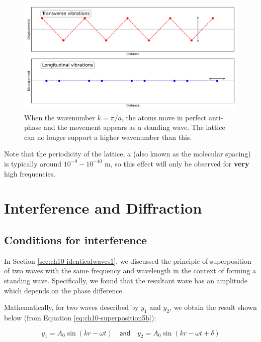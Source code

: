 \documentclass[
]{book}
\begin{document}
\begin{figure}

{\centering \includegraphics[width=0.7\linewidth]{visualisations/ch12-phonons2} 

}

\caption{When the wavenumber $k = \pi / a$, the atoms move in perfect anti-phase and the movement appears as a standing wave. The lattice can no longer support a higher wavenumber than this.}\label{fig:ch12-dispersionlattice1}
\end{figure}

Note that the periodicity of the lattice, \(a\) (also known as the molecular spacing) is typically around \(10^{-9} - 10^{-10}\) m, so this effect will only be observed for \textbf{very} high frequencies.

\hypertarget{sec:ch13-interference}{%
\chapter{Interference and Diffraction}\label{sec:ch13-interference}}

\hypertarget{sec:ch13-conditionsinterference}{%
\section{Conditions for interference}\label{sec:ch13-conditionsinterference}}

In Section \ref{sec:ch10-identicalwaves1}, we discussed the principle of superposition of two waves with the same frequency and wavelength in the context of forming a standing wave. Specifically, we found that the resultant wave has an amplitude which depends on the phase difference.

Mathematically, for two waves described by \(y_1\) and \(y_2\), we obtain the result shown below (from Equation \eqref{eq:ch10-superposition5b}):

\begin{equation}
y_1 = A_0 \sin(k r - \omega t) \quad \textsf{and} \quad y_2 = A_0 \sin(k r - \omega t + \delta)
\end{equation}
\end{document}

